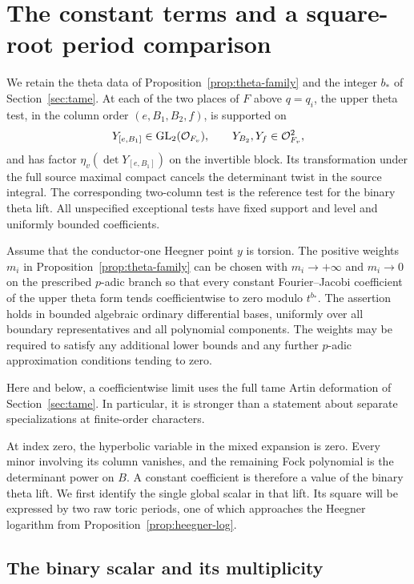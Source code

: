 \section{The constant terms and a square-root period comparison}
\label{sec:constant-terms}

We retain the theta data of Proposition~\ref{prop:theta-family} and the
integer $b_*$ of Section~\ref{sec:tame}.  At each of the two places of $F$
above $q=q_i$, the upper theta test, in the column order $(e,B_1,B_2,f)$,
is supported on
\[
 Y_{[e,B_1]}\in\operatorname{GL}_2(\mathcal O_{F_v}),\qquad
 Y_{B_2},Y_f\in\mathcal O_{F_v}^{2},
\]
and has factor $\eta_v(\det Y_{[e,B_1]})$ on the invertible block.  Its
transformation under the full source maximal compact cancels the
determinant twist in the source integral.  The corresponding two-column
test is the reference test for the binary theta lift.  All unspecified
exceptional tests have fixed support and level and uniformly bounded
coefficients.

\begin{proposition}\label{prop:constant-term-small}
Assume that the conductor-one Heegner point $y$ is torsion.  The positive
weights $m_i$ in Proposition~\ref{prop:theta-family} can be chosen with
$m_i\to+\infty$ and $m_i\to0$ on the prescribed $p$-adic branch so that
every constant Fourier--Jacobi coefficient of the upper theta form tends
coefficientwise to zero modulo $t^{b_*}$.  The assertion holds in bounded
algebraic ordinary differential bases, uniformly over all boundary
representatives and all polynomial components.  The weights may be
required to satisfy any additional lower bounds and any further
$p$-adic approximation conditions tending to zero.
\end{proposition}

Here and below, a coefficientwise limit uses the full tame Artin
deformation of Section~\ref{sec:tame}.  In particular, it is stronger than
a statement about separate specializations at finite-order characters.

At index zero, the hyperbolic variable in the mixed expansion is zero.
Every minor involving its column vanishes, and the remaining Fock
polynomial is the determinant power on $B$.  A constant coefficient is
therefore a value of the binary theta lift.  We first identify the single
global scalar in that lift.  Its square will be expressed by two raw
toric periods, one of which approaches the Heegner logarithm from
Proposition~\ref{prop:heegner-log}.

\subsection{The binary scalar and its multiplicity}

